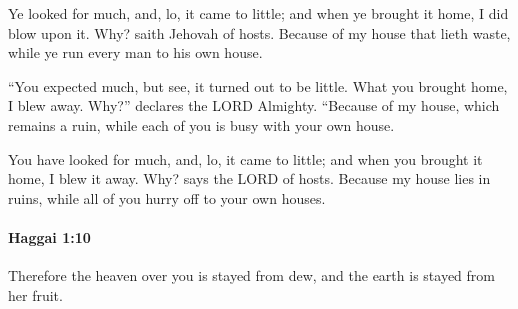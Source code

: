 			\begin{versebox}
					\item[BHS] 
					\item[LXX] 
					\item[ASV] Ye looked for much, and, lo, it came to little; and when ye brought it home, I did blow upon it. Why? saith Jehovah of hosts. Because of my house that lieth waste, while ye run every man to his own house.
					\item[NIV] “You expected much, but see, it turned out to be little. What you brought home, I blew away. Why?” declares the LORD Almighty. “Because of my house, which remains a ruin, while each of you is busy with your own house.
					\item[NRSV] You have looked for much, and, lo, it came to little; and when you brought it home, I blew it away. Why? says the LORD of hosts. Because my house lies in ruins, while all of you hurry off to your own houses.
			\end{versebox}

		\paragraph{Haggai 1:10} %
			\label{HAGGAI-1-10}

			Therefore the heaven over you is stayed from dew, and the earth is stayed from her fruit.

